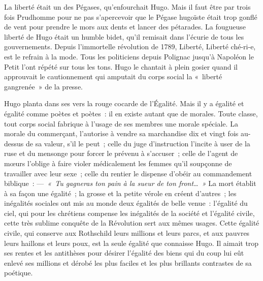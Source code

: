 \documentclass[french,twoside]{book} %
\begin{document}
La liberté était un des Pégases, qu’enfourchait Hugo. Mais il faut être par trois fois Prudhomme pour ne pas s’apercevoir que le Pégase hugoïste était trop gonflé de vent pour prendre le mors aux dents et lancer des pétarades. La fougueuse liberté de Hugo était un humble bidet, qu’il remisait dans l’écurie de tous les gouvernements. Depuis l’immortelle révolution de 1789, Liberté, Liberté ché-ri-e, est le refrain à la mode. Tous les politiciens depuis Polignac jusqu’à Napoléon le Petit l’ont répété sur  
\label{p41}tous les tons. Hugo le chantait à plein gosier quand il approuvait le cautionnement qui amputait du corps social la « liberté gangrenée » de la presse.\par
Hugo planta dans ses vers la rouge cocarde de l’Égalité. Mais il y a égalité et égalité comme poètes et poètes : il en existe autant que de morales. Toute classe, tout corps social fabrique à l’usage de ses membres une morale spéciale. La morale du commerçant, l’autorise à vendre sa marchandise dix et vingt fois au-dessus de sa valeur, s’il le peut ; celle du juge d’instruction l’incite à user de la ruse et du mensonge pour forcer le prévenu à s’accuser ; celle de l’agent de mœurs l’oblige à faire violer médicalement les femmes qu’il soupçonne de travailler avec leur sexe ; celle du rentier le dispense d’obéir au commandement biblique : — \emph{« Tu gagneras ton pain à la sueur de ton front… »} La mort établit à sa façon une égalité ; la grosse et la petite vérole en créent d’autres ; les inégalités sociales ont mis au monde deux égalités de belle venue : l’égalité du ciel, qui pour les chrétiens compense les inégalités de la société et l’égalité civile, cette très sublime conquête de la Révolution sert aux mêmes usages. Cette égalité civile, qui conserve aux Rothschild leurs millions et leurs parcs, et aux pauvres leurs haillons et leurs poux, est la seule égalité que connaisse Hugo. Il aimait trop ses rentes et les antithèses pour désirer l’égalité des biens qui du coup lui eût enlevé ses millions et dérobé les plus faciles et les plus brillants contrastes de sa poétique.\par
\end{document}
